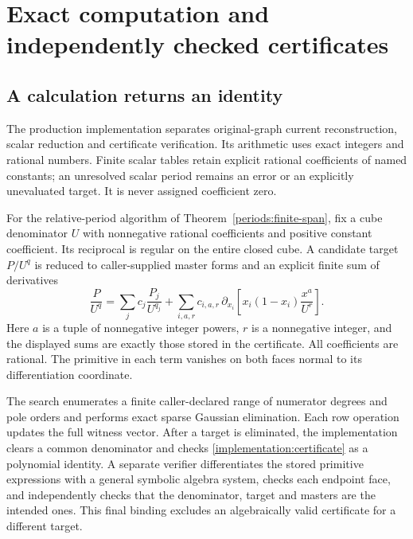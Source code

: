 \section{Exact computation and independently checked certificates}
\label{implementation:certificates}

\subsection{A calculation returns an identity}

The production implementation separates original-graph current
reconstruction, scalar reduction and certificate verification. Its
arithmetic uses exact integers and rational numbers. Finite scalar
tables retain explicit rational coefficients of named constants;
an unresolved scalar period remains an error or an explicitly
unevaluated target. It is never assigned coefficient zero.

For the relative-period algorithm of
Theorem~\ref{periods:finite-span}, fix a cube denominator $U$ with
nonnegative rational coefficients and positive constant coefficient.
Its reciprocal is regular on the entire closed cube. A candidate
target $P/U^q$ is reduced to caller-supplied master forms and an
explicit finite sum of derivatives
\begin{equation}
 \frac{P}{U^q}
 =\sum_j c_j\frac{P_j}{U^{q_j}}
  +\sum_{i,a,r}c_{i,a,r}\,
   \partial_{x_i}\left[x_i(1-x_i)\frac{x^a}{U^r}\right].
 \label{implementation:certificate}
\end{equation}
Here $a$ is a tuple of nonnegative integer powers, $r$ is a
nonnegative integer, and the displayed sums are exactly those
stored in the certificate. All coefficients are rational. The
primitive in each term vanishes on both faces normal to its
differentiation coordinate.

The search enumerates a finite caller-declared range of numerator
degrees and pole orders and performs exact sparse Gaussian
elimination. Each row operation updates the full witness vector.
After a target is eliminated, the implementation clears a common
denominator and checks \eqref{implementation:certificate} as a
polynomial identity. A separate verifier differentiates the stored
primitive expressions with a general symbolic algebra system,
checks each endpoint face, and independently checks that the
denominator, target and masters are the intended ones. This final
binding excludes an algebraically valid certificate for a different
target.

